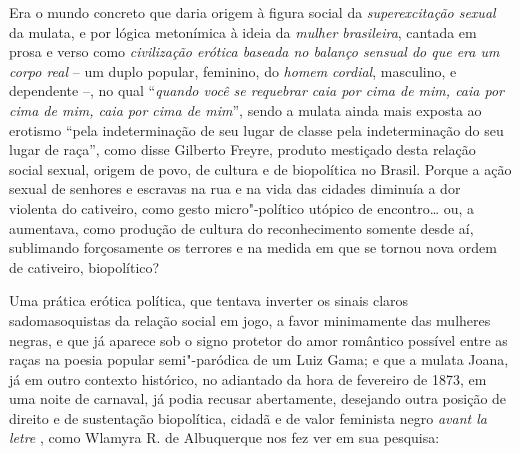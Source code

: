 Era o mundo concreto que daria origem à figura social da
\emph{superexcitação sexual} da mulata, e por lógica metonímica à ideia
da \emph{mulher brasileira}, cantada em prosa e verso como
\emph{civilização erótica baseada no balanço sensual do que era um corpo
real} -- um duplo popular, feminino, do \emph{homem} \emph{cordial},
masculino, e dependente --, no qual ``\emph{quando você se requebrar
caia por cima de mim, caia por cima de mim, caia por cima de mim}'',
sendo a mulata ainda mais exposta ao erotismo ``pela indeterminação de
seu lugar de classe pela indeterminação do seu lugar de raça'', como
disse Gilberto Freyre, produto mestiçado desta relação social sexual,
origem de povo, de cultura e de biopolítica no Brasil. Porque a ação
sexual de senhores e escravas na rua e na vida das cidades diminuía a
dor violenta do cativeiro, como gesto micro"-político utópico de
encontro\ldots{} ou, a aumentava, como produção de cultura do reconhecimento
somente desde aí, sublimando forçosamente os terrores e na medida em que
se tornou nova ordem de cativeiro, biopolítico?

Uma prática erótica política, que tentava inverter os sinais claros
sadomasoquistas da relação social em jogo, a favor minimamente das
mulheres negras, e que já aparece sob o signo protetor do amor romântico
possível entre as raças na poesia popular semi"-paródica de um Luiz Gama;
e que a mulata Joana, já em outro contexto histórico, no adiantado da
hora de fevereiro de 1873, em uma noite de carnaval, já podia recusar
abertamente, desejando outra posição de direito e de sustentação
biopolítica, cidadã e de valor feminista negro \emph{avant la letre} ,
como Wlamyra R. de Albuquerque nos fez ver em sua pesquisa:

